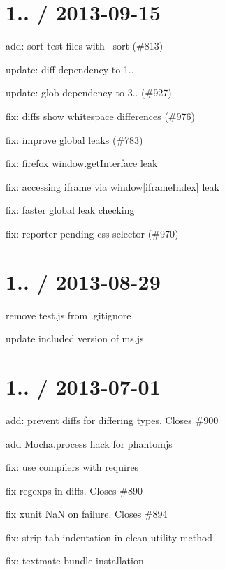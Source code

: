 \section*{1.. / 2013-\/09-\/15}


\begin{DoxyItemize}
\item add\+: sort test files with --sort (\#813)
\item update\+: diff dependency to 1..
\item update\+: glob dependency to 3.. (\#927)
\item fix\+: diffs show whitespace differences (\#976)
\item fix\+: improve global leaks (\#783)
\item fix\+: firefox window.\+get\+Interface leak
\item fix\+: accessing iframe via window\mbox{[}iframe\+Index\mbox{]} leak
\item fix\+: faster global leak checking
\item fix\+: reporter pending css selector (\#970)
\end{DoxyItemize}

\section*{1.. / 2013-\/08-\/29}


\begin{DoxyItemize}
\item remove test.\+js from .gitignore
\item update included version of ms.\+js
\end{DoxyItemize}

\section*{1.. / 2013-\/07-\/01}


\begin{DoxyItemize}
\item add\+: prevent diffs for differing types. Closes \#900
\item add {\ttfamily Mocha.\+process} hack for phantomjs
\item fix\+: use compilers with requires
\item fix regexps in diffs. Closes \#890
\item fix xunit NaN on failure. Closes \#894
\item fix\+: strip tab indentation in {\ttfamily clean} utility method
\item fix\+: textmate bundle installation
\end{DoxyItemize}

